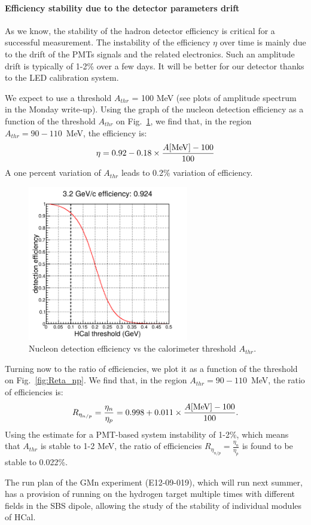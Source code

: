 \paragraph{Efficiency stability due to the detector parameters drift}

As we know, the stability of the hadron detector efficiency is critical for a successful measurement.
The instability of the efficiency $\eta$ over time is mainly due to the drift of the PMTs signals and the related electronics.
Such an amplitude drift is typically of 1-2\% over a few days.
It will be better for our detector thanks to the LED calibration system.

We expect to use a threshold $A_{thr}$ = 100 MeV (see plots of amplitude spectrum in the Monday write-up).
Using the graph of the nucleon detection efficiency as a function of the threshold $A_{thr}$ on Fig.~\ref{fig:eta_N},
we find that, in the region $A_{thr} = 90 - 110$~MeV, the efficiency is:
%
\begin{equation}
  \eta = 0.92 - 0.18 \times \frac{A[{\rm MeV}]-100}{100}
\end{equation}
%
A one percent variation of $A_{thr}$ leads to 0.2\% variation of efficiency.
%
\begin{figure}[!h]
  \centering
  \includegraphics[width=7cm]{Answers_Readers/Neff_fThr.pdf}
  \caption{Nucleon detection efficiency vs the calorimeter threshold $A_{thr}$.}
  \label{fig:eta_N}
\end{figure}
%

Turning now to the ratio of efficiencies, we plot it as a function of the threshold on Fig.~\ref{fig:Reta_np}.
We find that, in the region $A_{thr} = 90 - 110$~MeV, the ratio of efficiencies is:
%
\begin{equation}
  R_{\eta_{n/p}} = \frac{\eta_n}{\eta_p} = 0.998 + 0.011 \times \frac{A[{\rm MeV}]-100}{100}.
\end{equation}
%
Using the estimate for a PMT-based system instability of 1-2\%, which means that $A_{thr}$ is stable to 1-2 MeV,
the ratio of efficiencies $R_{\eta_{n/p}} = \frac{\eta_n}{\eta_p}$ is found to be stable to 0.022\%.

The run plan of the GMn experiment (E12-09-019), which will run next summer,
has a provision of running on the hydrogen target multiple times with different fields in the SBS dipole,
allowing the study of the stability of individual modules of HCal.

